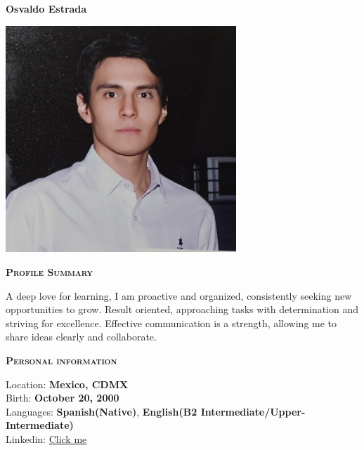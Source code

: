 \documentclass[11pt, a4paper]{article}
\newcommand{\headleft}[1]{\vspace*{3ex}\textsc{\textbf{#1}}\par%
    \vspace*{-1.5ex}\hrulefill\par\vspace*{0.7ex}}
\begin{document}
\setlength{\topskip}{0pt}
\setlength{\parindent}{0pt}
\setlength{\parskip}{0pt}
\setlength{\fboxsep}{0pt}
\pagestyle{empty}
\raggedbottom

\begin{minipage}[t]{0.33\textwidth} %
\colorbox{cvblue}{\begin{minipage}[t][5mm][t]{\textwidth}\null\hfill\null\end{minipage}}

\vspace{-.2ex} %
\colorbox{cvblue!90}{\color{white}  %
\textwidth\relax%
\begin{minipage}[t][293mm][t]{0.82\textwidth}
\raggedright
\vspace*{2.5ex}

\Large \textbf{Osvaldo Estrada} \normalsize

\null\hfill\includegraphics[width=0.65\textwidth]{osvaldo.jpg}\hfill\null

\vspace*{0.5ex} %

\headleft{Profile Summary}
A deep love for learning, I am
proactive and organized, consistently
seeking new opportunities to grow.
Result oriented, approaching tasks
with determination and striving for
excellence. Effective communication
is a strength, allowing me to share
ideas clearly and collaborate.


\headleft{Personal information}
Location: \textbf{Mexico, CDMX} \\[0.5ex]
Birth: \textbf{October 20, 2000} \\[0.5ex]
Languages: \textbf{Spanish(Native)}, \textbf{English(B2 Intermediate/Upper-Intermediate)} \\[0.5ex]
Linkedin: \href{https://www.linkedin.com/in/osvaldo-israel-estrada-sosa-19529919a/}{Click me}


\end{minipage}}
\end{minipage}
\end{document}

